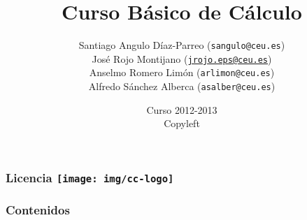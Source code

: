 \documentclass[trans,mathserif,profesionalfont,10pt,dvips,blue,xcolor=table]{beamer}
\title{Curso Básico de Cálculo}
\author[]{
Santiago Angulo Díaz-Parreo (\texttt{sangulo@ceu.es})\\ 
José Rojo Montijano (\texttt{\url{jrojo.eps@ceu.es}})\\
Anselmo Romero Limón (\texttt{arlimon@ceu.es})\\
Alfredo Sánchez Alberca (\texttt{asalber@ceu.es})\\ 
}
\institute[USP CEU]{
\texttt{[image: img/logo\_uspceu\_01]}\\[0.5cm]Facultad de Farmacia
}
\date{Curso 2012-2013\\ \textcopyleft Copyleft}
\theoremstyle{definition}
\begin{document}
\begin{frame}
\titlepage
\end{frame}


\begin{frame}
\frametitle{Licencia \texttt{[image: img/cc-logo]}}

\end{frame}


\begin{frame}
\frametitle{Contenidos}
\setlength{\parskip}{0em}
\tableofcontents[hideallsubsections]
\end{frame}





% 
% 
% 
% 
% 
\end{document}
